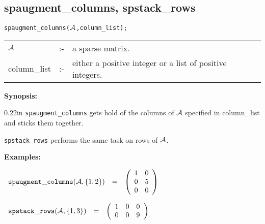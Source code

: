 \subsection{spaugment\_columns, spstack\_rows}

\hspace*{0.175in} {\tt spaugment\_columns(${\cal A}$,column\_list);}

\hspace*{0.1in}
\begin{tabular}{l l l}
${\cal A}$  &:-& a sparse matrix. \\
column\_list &:-&  either a positive integer or a list of positive 
                   integers. 
\end{tabular}

{\bf Synopsis:} 

\begin{addtolength}{\leftskip}{0.22in}
{\tt spaugment\_columns} gets hold of the columns of ${\cal A}$ specified 
in column\_list and sticks them together. 

{\tt spstack\_rows} performs the same task on rows of 
                ${\cal A}$.

\end{addtolength}

{\bf Examples:}

\begin{flushleft}  
\hspace*{0.1in}
\begin{math}
\begin{array}{ccc}
{\tt spaugment\_columns}({\cal A},\{1,2\}) & = & 
\left( \begin{array}{cc} 1 & 0 \\ 0 & 5 \\ 0 & 0  
\end{array} \right)  
\end{array}
\end{math}  
\end{flushleft}

\vspace*{0.1in}

\begin{flushleft}  
\hspace*{0.1in}
\begin{math}  
\begin{array}{ccc}
{\tt spstack\_rows}({\cal A},\{1,3\}) & = & 
\left( \begin{array}{ccc} 1 & 0 & 0 \\ 0 & 0 & 9
\end{array} \right)  
\end{array}  
\end{math}
\end{flushleft}

